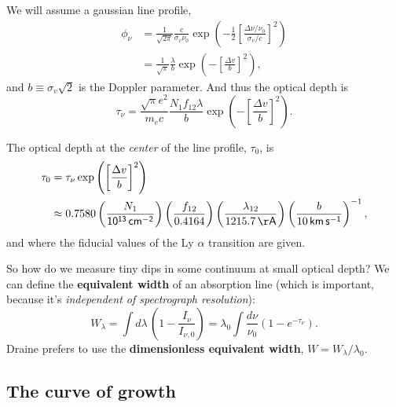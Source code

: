 \documentclass{tufte-handout}
\renewcommand{\textbf}[1]{{\bf \textcolor{dark-gray}{#1}}}
\renewcommand{\rm}{\sf}
\begin{document}
We will assume a gaussian line profile,
\begin{align}
\phi_\nu &= \frac{1}{\sqrt{2\pi}} \frac{c}{\sigma_v \nu_0} \exp\left (-\frac{1}{2}\left [\frac{\Delta \nu / \nu_0}{\sigma_v/c} \right ]^2\right ) \nonumber \\
&= \frac{1}{\sqrt{\pi}} \frac{\lambda}{b} \exp\left (- \left [\frac{\Delta v}{b}\right ]^2\right ),
\end{align}
and $b \equiv \sigma_v \sqrt{2}$ is the Doppler parameter. And thus the optical depth is
\begin{equation}
\tau_\nu = \frac{\sqrt{\pi} e^2}{m_e c} \frac{N_1 f_{12} \lambda}{b}\exp\left (-\left [\frac{\Delta v}{b}\right ]^2\right ).
\end{equation}

The optical depth at the \textit{center} of the line profile, $\tau_0$, is
\begin{align}
\tau_0 &= \tau_\nu \exp\left (\left [\frac{\Delta v}{b}\right ]^2\right ) \\
&\approx 0.7580 \left (\frac{N_1}{\rm 10^{13}\, cm^{-2}}\right )\left (\frac{f_{12}}{0.4164}\right ) \left (\frac{\lambda_{12}}{1215.7\, \rm \AA{}}\right )\left (\frac{b}{10\rm\, km\, s^{-1}}\right )^{-1}, \nonumber
\end{align}
and where the fiducial values of the Ly $\alpha$ transition are given.

So how do we measure tiny dips in some continuum at small optical depth? We can define the \textbf{equivalent width} of an absorption line (which is important, because it's \textit{independent of spectrograph resolution}):
\begin{equation}
W_\lambda = \int d\lambda \, \left (1 - \frac{I_\nu}{I_{\nu, 0}}\right ) = \lambda_0 \int \frac{d\nu}{\nu_0}\left (1 - e^{-\tau_\nu}\right ).
\end{equation}
Draine prefers to use the \textbf{dimensionless equivalent width}, $W = W_\lambda / \lambda_0$. 

\subsection{The curve of growth}
\end{document}
